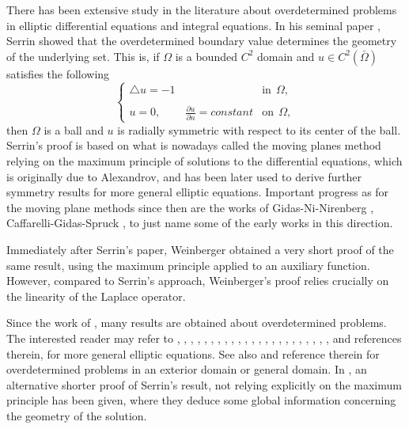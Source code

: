 \documentclass[12pt]{amsproc}
\theoremstyle{plain}
\numberwithin{equation}{section}
\begin{document}
There has been extensive study in the literature about
overdetermined problems in elliptic differential equations and
integral equations. In his seminal paper \cite{Se}, Serrin showed
that the overdetermined boundary value determines the geometry of
the underlying set. This is, if $\Omega$ is a bounded $C^2$ domain
and $u\in C^2(\bar\Omega)$ satisfies the following
\begin{equation}
\left \{ \begin{array}{ll} {\mbox{$\bigtriangleup$}} u=-1    & \mbox{in} \ \ \Omega, \\
\\
u=0, \qquad \ \frac{\partial u}{\partial n}=constant &\mbox{on}\ \
\Omega,
\end{array}
\right.
\end{equation}
then $\Omega$ is a ball and $u$ is radially symmetric with respect
to its center of the ball. Serrin's proof  is based on what is
nowadays called the moving planes method relying on the maximum
principle of solutions to the differential equations,  which is
originally due to Alexandrov, and has been later used to derive
further symmetry results for more general elliptic equations.
  Important progress as for the moving plane methods since then are the works of Gidas-Ni-Nirenberg \cite{GNN},
   Caffarelli-Gidas-Spruck \cite{CGS},  to just name some of the early works in this direction.

Immediately after Serrin's paper, Weinberger \cite{W} obtained a
very short proof of the same result, using the maximum principle
applied to an auxiliary function. However, compared to Serrin's
approach, Weinberger's proof  relies crucially on the linearity of
the Laplace operator.

Since the work of \cite{Se}, many results are obtained about
overdetermined problems. The interested reader may refer to
\cite{AB}, \cite{B}, \cite{BK},  \cite{BNST}, \cite{BNST1}, \cite{CS},
\cite{EP}, \cite{FG}, \cite{FGK}, \cite{FK}, \cite{FV}, \cite{G},
\cite{GL}, \cite{HPP}, \cite{Lim}, \cite{Liu}, \cite{M}, \cite{MR},
\cite{PP}, \cite{PS}, \cite{P}, \cite{Sh}, \cite{Si},  \cite{WX}
and references therein, for more general elliptic equations.  See
also \cite{R1} and reference therein for overdetermined problems in
an exterior domain or general domain. In \cite{BNST}, an alternative
shorter proof of Serrin's result, not relying explicitly on the
maximum principle has been  given, where they deduce some global
information concerning the geometry of the solution.
\end{document}
